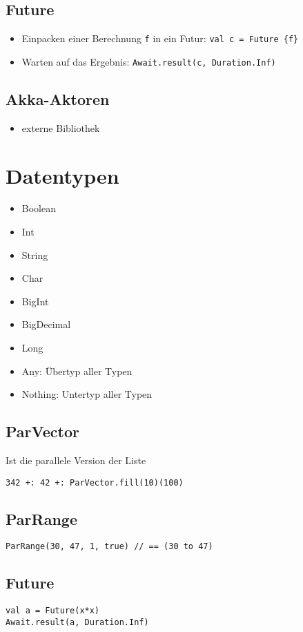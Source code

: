 \subsection{Future}
\begin{itemize}
	\item Einpacken einer Berechnung \verb|f| in ein Futur: \verb|val c = Future {f}|
	\item Warten auf das Ergebnis: \verb|Await.result(c, Duration.Inf)|
\end{itemize}
\subsection{Akka-Aktoren}
\begin{itemize}
	\item externe Bibliothek
\end{itemize}
\section{Datentypen}
\begin{itemize}
	\item Boolean
	\item Int
	\item String
	\item Char
	\item BigInt
	\item BigDecimal
	\item Long
	\item Any: Übertyp aller Typen
	\item Nothing: Untertyp aller Typen
\end{itemize}
\subsection{ParVector}
Ist die parallele Version der Liste
\begin{verbatim}
342 +: 42 +: ParVector.fill(10)(100)
\end{verbatim}
\subsection{ParRange}
\begin{verbatim}
ParRange(30, 47, 1, true) // == (30 to 47)
\end{verbatim}
\subsection{Future}
\begin{verbatim}
val a = Future(x*x)
Await.result(a, Duration.Inf)
\end{verbatim}





